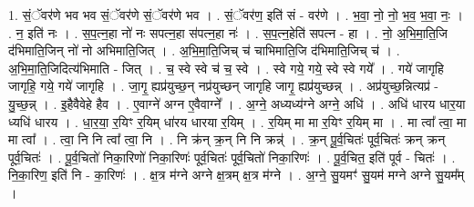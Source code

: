 \documentclass[17pt]{extarticle}
\begin{document}
1. सं॒ॅवर॑णे भव भव सं॒ॅवर॑णे सं॒ॅवर॑णे भव । . सं॒ॅवर॑ण॒ इति॑ सं - वर॑णे । . भ॒वा॒ नो॒ नो॒ भ॒व॒ भ॒वा॒ नः॒ । . न॒ इति॑ नः । . स॒प॒त्न॒हा नो॑ नः सपत्न॒हा स॑पत्न॒हा नः॑ । . स॒प॒त्न॒हेति॑ सपत्न - हा । . नो॒ अ॒भि॒मा॒ति॒जि द॑भिमाति॒जिन् नो॑ नो अभिमाति॒जित् । . अ॒भि॒मा॒ति॒जिच् च॑ चाभिमाति॒जि द॑भिमाति॒जिच् च॑ । . अ॒भि॒मा॒ति॒जिदित्य॑भिमाति - जित् । . च॒ स्वे स्वे च॑ च॒ स्वे । . स्वे गये॒ गये॒ स्वे स्वे गये᳚ । . गये॑ जागृहि जागृहि॒ गये॒ गये॑ जागृहि । . जा॒गृ॒ ह्यप्र॑युच्छ॒न् नप्र॑युच्छन् जागृहि जागृ॒ ह्यप्र॑युच्छन्न् । . अप्र॑युच्छ॒न्नित्यप्र॑ - यु॒च्छ॒न्न् । . इ॒हैवैवेहे हैव । . ए॒वाग्ने॑ अग्न ए॒वैवाग्ने᳚ । . अ॒ग्ने॒ अध्यध्य॑ग्ने अग्ने॒ अधि॑ । . अधि॑ धारय धार॒या ध्यधि॑ धारय । . धा॒र॒या॒ र॒यिꣳ र॒यिम् धा॑रय धारया र॒यिम् । . र॒यिम् मा मा र॒यिꣳ र॒यिम् मा । . मा त्वा᳚ त्वा॒ मा मा त्वा᳚ । . त्वा॒ नि नि त्वा᳚ त्वा॒ नि । . नि क्र॑न् क्र॒न् नि नि क्रन्न्॑ । . क्र॒न् पू॒र्व॒चितः॑ पूर्व॒चितः॑ क्रन् क्रन् पूर्व॒चितः॑ । . पू॒र्व॒चितो॑ निका॒रिणो॑ निका॒रिणः॑ पूर्व॒चितः॑ पूर्व॒चितो॑ निका॒रिणः॑ । . पू॒र्व॒चित॒ इति॑ पूर्व - चितः॑ । . नि॒का॒रिण॒ इति॑ नि - का॒रिणः॑ । . क्ष॒त्र म॑ग्ने अग्ने क्ष॒त्रम् क्ष॒त्र म॑ग्ने । . अ॒ग्ने॒ सु॒यमꣳ॑ सु॒यम॑ मग्ने अग्ने सु॒यम᳚म् । \newline
\end{document}
